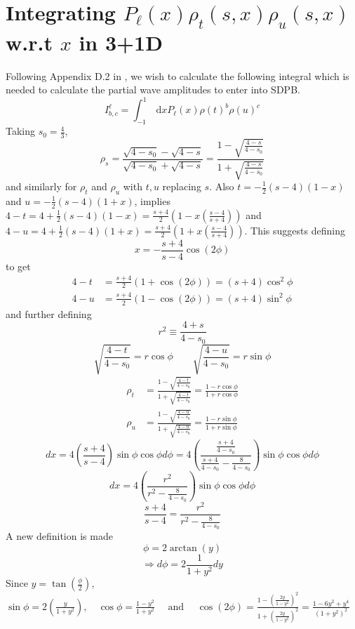 ﻿\documentclass[12pt,a4paper]{article}
\begin{document}
\section{Integrating $P_{\ell}(x) \rho_{t}(s,x) \rho_{u}(s,x)$ w.r.t $x$ in 3+1D}
Following Appendix D.2 in \cite{5}, we wish to calculate the following integral which is needed to calculate the partial wave amplitudes to enter into SDPB.
$$
I_{b, c}^{\ell}=\int_{-1}^{1} \mathrm{~d} x P_{\ell}(x) \rho(t)^{b} \rho(u)^{c}
$$
Taking $s_{0}=\frac{4}{3}$,
$$
\rho_{s}=\frac{\sqrt{4-s_{0}}-\sqrt{4-s}}{\sqrt{4-s_{0}}+\sqrt{4-s}}=\frac{1-\sqrt{\frac{4-s}{4-s_{0}}}}{1+\sqrt{\frac{4-s}{4-s_{0}}}}
$$
and similarly for $\rho_{t}$ and $\rho_{u}$ with $t,u$ replacing $s$. Also $t=-\frac{1}{2}(s-4)(1-x)$ and $u=-\frac{1}{2}(s-4)(1+x)$, implies $4-t=4+\frac{1}{2}(s-4)(1-x)=\frac{s+4}{2}\left( 1-x\left(\frac{s-4}{s+4}\right) \right)$ and $4-u=4+\frac{1}{2}(s-4)(1+x)=\frac{s+4}{2}\left( 1+x\left(\frac{s-4}{s+4}\right) \right)$. This suggests defining 
$$
x=-\frac{s+4}{s-4} \cos (2 \phi)
$$
to get 
$$
\begin{aligned}
4-t&=\frac{s+4}{2}\left( 1+ \cos (2 \phi) \right)=(s+4) \cos^{2}\phi \\
4-u&=\frac{s+4}{2}\left( 1- \cos (2 \phi) \right)=(s+4) \sin^{2}\phi
\end{aligned}
$$
and further defining 
$$
r^{2} \equiv \frac{4+s}{4-s_{0}}
$$
$$
\sqrt{\frac{4-t}{4-s_{0}}}=r \cos \phi \qquad \sqrt{\frac{4-u}{4-s_{0}}}=r \sin \phi
$$
$$
\begin{aligned}
\rho_{t}&=\frac{1-\sqrt{\frac{4-t}{4-s_{0}}}}{1+\sqrt{\frac{4-t}{4-s_{0}}}}=\frac{1-r \cos \phi}{1+r \cos \phi}\\
\rho_{u}&=\frac{1-\sqrt{\frac{4-u}{4-s_{0}}}}{1+\sqrt{\frac{4-u}{4-s_{0}}}}=\frac{1-r \sin \phi}{1+r \sin \phi}
\end{aligned}
$$
$$
dx=4\left(\frac{s+4}{s-4}\right) \sin \phi \cos \phi d\phi=4\left(\frac{\frac{s+4}{4-s_{0}}}{\frac{s+4}{4-s_{0}}-\frac{8}{4-s_{0}}}\right) \sin \phi \cos \phi d\phi
$$
$$
dx=4\left(\frac{r^{2}}{r^{2}-\frac{8}{4-s_{0}}}\right) \sin \phi \cos \phi d\phi
$$
$$
\frac{s+4}{s-4}=\frac{r^{2}}{r^{2}-\frac{8}{4-s_{0}}}
$$
A new definition is made
$$
\phi=2 \arctan (y)
$$
$$
 \Rightarrow d \phi=2 \frac{1}{1+y^{2}} d y
$$
Since $y=\tan \left(\frac{\phi}{2} \right)$, \quad $\sin \phi=2 \left( \frac{y}{1+y^{2}}\right), \quad \cos \phi=\frac{1-y^{2}}{1+y^{2}} \quad \text{ and } \quad \cos(2\phi)=\frac{1-\left(\frac{2 y}{1-y^{2}}\right)^{2}}{1+\left(\frac{2 y}{1-y^{2}}\right)^{2}}=\frac{1-6 y^{2}+y^{4}}{\left(1+y^{2}\right)^{2}}$
\end{document}
